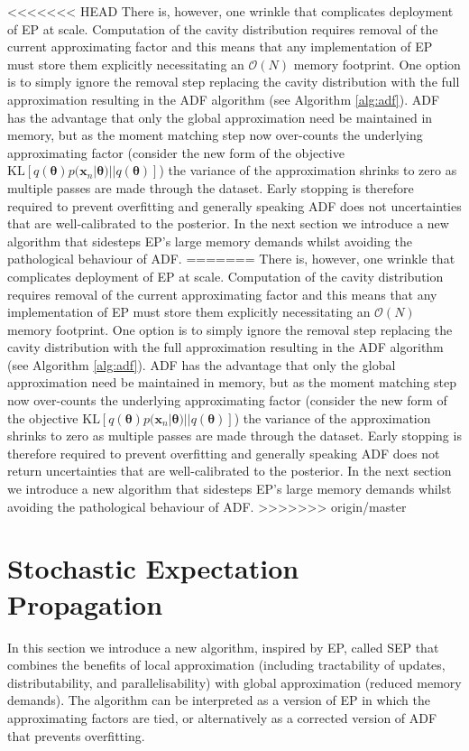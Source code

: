 <<<<<<< HEAD
There is, however, one wrinkle that complicates deployment of EP at scale. Computation of the cavity distribution requires removal of the current approximating factor and this means that any implementation of EP must store them explicitly necessitating an $\mathcal{O}(N)$ memory footprint. One option is to simply ignore the removal step replacing the cavity distribution with the full approximation resulting in the ADF algorithm (see Algorithm \ref{alg:adf}). ADF has the advantage that only the global approximation need be maintained in memory, but as the moment matching step now over-counts the underlying approximating factor (consider the new form of the objective $\mathrm{KL}[q(\mathbf{\theta}) p(\bm{x}_n | \bm{\theta}) || q(\bm{\theta})]$) the variance of the approximation shrinks to zero as multiple passes are made through the dataset. Early stopping is therefore required to prevent overfitting and generally speaking ADF does not uncertainties that are well-calibrated to the posterior. In the next section we introduce a new algorithm that sidesteps EP's large memory demands whilst avoiding the pathological behaviour of ADF. 
=======
There is, however, one wrinkle that complicates deployment of EP at scale. Computation of the cavity distribution requires removal of the current approximating factor and this means that any implementation of EP must store them explicitly necessitating an $\mathcal{O}(N)$ memory footprint. One option is to simply ignore the removal step replacing the cavity distribution with the full approximation resulting in the ADF algorithm (see Algorithm \ref{alg:adf}). ADF has the advantage that only the global approximation need be maintained in memory, but as the moment matching step now over-counts the underlying approximating factor (consider the new form of the objective $\mathrm{KL}[q(\bm{\theta}) p(\bm{x}_n | \bm{\theta}) || q(\bm{\theta})]$) the variance of the approximation shrinks to zero as multiple passes are made through the dataset. Early stopping is therefore required to prevent overfitting and generally speaking ADF does not return uncertainties that are well-calibrated to the posterior. 
%
In the next section we introduce a new algorithm that sidesteps EP's large memory demands whilst avoiding the pathological behaviour of ADF. 
>>>>>>> origin/master

\section{Stochastic Expectation Propagation}
%
In this section we introduce a new algorithm, inspired by EP, called SEP that combines the benefits of local approximation (including tractability of updates, distributability, and parallelisability) with global approximation (reduced memory demands).  The algorithm can be interpreted as a version of EP in which the approximating factors are tied, or alternatively as a corrected version of ADF that prevents overfitting. 

